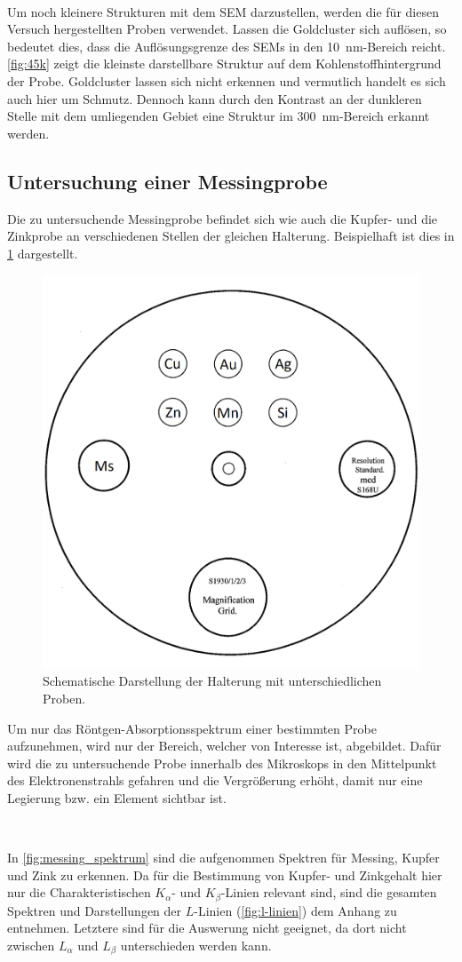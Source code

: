 	\

	Um noch kleinere Strukturen mit dem SEM darzustellen, werden die für diesen Versuch hergestellten Proben verwendet.
	Lassen die Goldcluster sich auflösen, so bedeutet dies, dass die Auflösungsgrenze des SEMs in den \SI{10}{\nano\meter}-Bereich reicht.
	\cref{fig:45k} zeigt die kleinste darstellbare Struktur auf dem Kohlenstoffhintergrund der Probe.
	Goldcluster lassen sich nicht erkennen und vermutlich handelt es sich auch hier um Schmutz.
	Dennoch kann durch den Kontrast an der dunkleren Stelle mit dem umliegenden Gebiet eine Struktur im \SI{300}{\nano\meter}-Bereich erkannt werden.


\subsection{Untersuchung einer Messingprobe}

	Die zu untersuchende Messingprobe befindet sich wie auch die Kupfer- und die Zinkprobe an verschiedenen Stellen der gleichen Halterung.
	Beispielhaft ist dies in \cref{fig:messing_halterung} dargestellt.
	\begin{figure}
		\centering
		\includegraphics[width=.4\textwidth]{img/Messingprobe}
		\caption{Schematische Darstellung der Halterung mit unterschiedlichen Proben.\cite{wwu}}
		\label{fig:messing_halterung}
	\end{figure}
	Um nur das Röntgen-Absorptionsspektrum einer bestimmten Probe aufzunehmen, wird nur der Bereich, welcher von Interesse ist, abgebildet.
	Dafür wird die zu untersuchende Probe innerhalb des Mikroskops in den Mittelpunkt des Elektronenstrahls gefahren und die Vergrößerung erhöht, damit nur eine Legierung bzw. ein Element sichtbar ist.

	\

	In \cref{fig:messing_spektrum} sind die aufgenommen Spektren für Messing, Kupfer und Zink zu erkennen.
	Da für die Bestimmung von Kupfer- und Zinkgehalt hier nur die Charakteristischen $K_\alpha$- und $K_\beta$-Linien relevant sind, sind die gesamten Spektren und Darstellungen der $L$-Linien (\cref{fig:l-linien}) dem Anhang zu entnehmen.
	Letztere sind für die Auswerung nicht geeignet, da dort nicht zwischen $L_\alpha$ und $L_\beta$ unterschieden werden kann.

